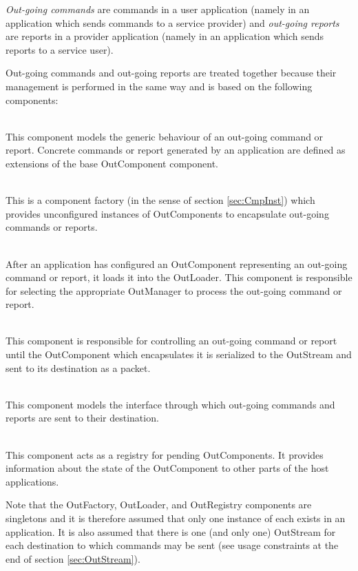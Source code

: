 \textit{Out-going commands} are commands in a user application (namely in an application which sends commands to a service provider) and \textit{out-going reports} are reports in a provider application (namely in an application which sends reports to a service user).

Out-going commands and out-going reports are treated together because their management is performed in the same way and is based on the following components:

\begin{fw_description}
\item[OutComponent]\hfill\\ 
This component models the generic behaviour of an out-going command or report. Concrete commands or report generated by an application are defined as extensions of the base OutComponent component. 
\item[OutFactory]\hfill\\ 
This is a component factory (in the sense of section \ref{sec:CmpInst}) which provides unconfigured instances of OutComponents to encapsulate out-going commands or reports.
\item[OutLoader]\hfill\\ 
After an application has configured an OutComponent representing an out-going command or report, it loads it into the OutLoader. This component is responsible for selecting the appropriate OutManager to process the out-going command or report. 
\item[OutManager]\hfill\\ 
This component is responsible for controlling an out-going command or report until the OutComponent which encapsulates it is serialized to the OutStream and sent to its destination as a packet.
\item[OutStream]\hfill\\ 
This component models the interface through which out-going commands and reports are sent to their destination.
\item[OutRegistry]\hfill\\ 
This component acts as a registry for pending OutComponents. It provides information about the state of the OutComponent to other parts of the host applications. 
\end{fw_description}

Note that the OutFactory, OutLoader, and OutRegistry components are singletons and it is therefore assumed that only one instance of each exists in an application. It is also assumed that there is one (and only one) OutStream for each destination to which commands may be sent (see usage constraints at the end of section \ref{sec:OutStream}).

